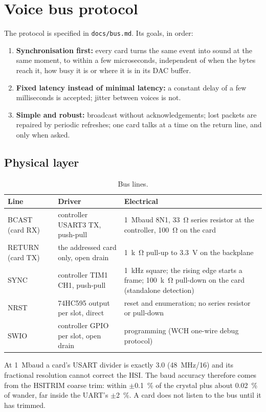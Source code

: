 \documentclass[11pt,a4paper]{article}
\newcommand{\file}[1]{\texttt{#1}}
\begin{document}
\section{Voice bus protocol}\label{sec:bus}
The protocol is specified in \file{docs/bus.md}. Its goals, in order:
\begin{enumerate}
  \item \textbf{Synchronisation first:} every card turns the same event into sound at the same moment, to within a few
    microseconds, independent of when the bytes reach it, how busy it is or where it is in its DAC buffer.
  \item \textbf{Fixed latency instead of minimal latency:} a constant delay of a few milliseconds is accepted; jitter
    between voices is not.
  \item \textbf{Simple and robust:} broadcast without acknowledgements; lost packets are repaired by periodic
    refreshes; one card talks at a time on the return line, and only when asked.
\end{enumerate}

\subsection{Physical layer}
\begin{table}[htbp]
\centering\small
\caption{Bus lines.}\label{tab:busphy}
\begin{tabularx}{\textwidth}{@{}l l X@{}}
\toprule
Line & Driver & Electrical \\
\midrule
BCAST (card RX) & controller USART3 TX, push-pull & \SI{1}{Mbaud} 8N1, \SI{33}{\ohm} series resistor at the controller,
  \SI{100}{\ohm} on the card \\
RETURN (card TX) & the addressed card only, open drain & \SI{1}{k\ohm} pull-up to \SI{3.3}{V} on the backplane \\
SYNC & controller TIM1 CH1, push-pull & \SI{1}{kHz} square; the rising edge starts a frame; \SI{100}{k\ohm} pull-down
  on the card (standalone detection) \\
NRST & 74HC595 output per slot, direct & reset and enumeration; no series resistor or pull-down \\
SWIO & controller GPIO per slot, open drain & programming (WCH one-wire debug protocol) \\
\bottomrule
\end{tabularx}
\end{table}
At \SI{1}{Mbaud} a card's USART divider is exactly 3.0 (\SI{48}{MHz}/16) and its fractional resolution cannot correct
the HSI. The baud accuracy therefore comes from the HSITRIM coarse trim: within $\pm$\SI{0.1}{\percent} of the crystal
plus about \SI{0.02}{\percent} of wander, far inside the UART's $\pm$\SI{2}{\percent}. A card does not listen to the
bus until it has trimmed.
\end{document}
